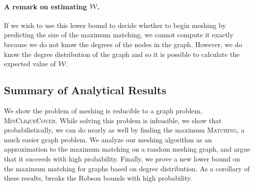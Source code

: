 \paragraph*{A remark on estimating $\mathcal {W}$.}  If we wish to use this lower bound to decide whether to begin meshing by predicting the size of the maximum matching, we cannot compute it exactly because we do not know the degrees of the nodes in the graph.  However, we do know the degree distribution of the graph and so it is possible to calculate the expected value of $\mathcal {W}$.






\subsection{Summary of Analytical Results}
We show the problem of meshing is reducible to a graph problem,
\textsc{MinCliqueCover}.  While solving this problem is infeasible, we
show that probabilistically, we can do nearly as well by finding the
maximum \textsc{Matching}, a much easier graph problem. We analyze our
meshing algorithm as an approximation to the maximum matching on a
random meshing graph, and argue that it succeeds with high
probability.  Finally, we prove a new lower bound on the maximum matching for graphs based on degree distribution.
As a corollary of these results, \Mesh breaks the Robson
bounds with high probability.

